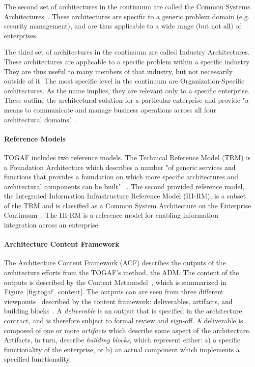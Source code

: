 The second set of architectures in the continuum are called the Common Systems Architectures~\cite[Ch. 39.4.1]{togaf9.1}. These architectures are specific to a generic problem domain (e.g. security management), and are thus applicable to a wide range (but not all) of enterprises.

The third set of architectures in the continuum are called Industry Architectures. These architectures are applicable to a specific problem within a specific industry. They are thus useful to many members of that industry, but not necessarily outside of it. The most specific level in the continuum are Organization-Specific  architectures. As the name implies, they are relevant only to a specific enterprise. These outline the architectural solution for a particular enterprise and provide "a means to communicate and manage business operations across all four architectural domains"~\cite[Ch. 39.4.1]{togaf9.1}.

\paragraph*{Reference Models}
TOGAF includes two reference models. The Technical Reference Model (TRM) is a Foundation Architecture which describes a number "of generic services and functions that provides a foundation on which more specific architectures and architectural components can be built" ~\cite[Sec. 43.1.1]{togaf9.1}. The second provided reference model, the Integrated Information Infrastructure Reference Model (III-RM), is a subset of the TRM and is classified as a Common System Architecture on the Enterprise Continuum~\cite[Ch. 44]{togaf9.1}. The III-RM is a reference model for enabling information integration across an enterprise. 



\paragraph*{Architecture Content Framework}
The Architecture Content Framework (ACF) describes the outputs of the architecture efforts from the TOGAF's method, the ADM. The content of the outputs is described by the Content Metamodel~\cite[Ch. 34]{togaf9.1}, which is summarized in Figure~\ref{fig:togaf_content}. The outputs can are seen from three different viewpoints~\cite[Ch. 4]{Bente2012} described by the content framework: deliverables, artifacts, and building blocks~\cite[Ch. 33]{togaf9.1}. A \textit{deliverable} is an output that is specified in the architecture contract, and is therefore subject to formal review and sign-off. A deliverable is composed of one or more \textit{artifacts} which describe some aspect of the architecture. Artifacts, in turn, describe \textit{building blocks}, which represent either: a) a specific functionality of the enterprise, or b) an actual component which implements a specified functionality.

